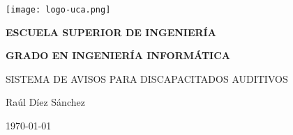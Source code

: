 \begin{titlepage}

  \begin{center}

    \texttt{[image: logo-uca.png]} \\
    
    \vspace{2.5cm}
    
    \LARGE{\textbf{ESCUELA SUPERIOR DE INGENIERÍA}} \\
    
    \vspace{1.0cm}
    
    \Large{\textbf{GRADO EN INGENIERÍA INFORMÁTICA}} \\
    
    \vspace{3.0cm}
    
    \Large{SISTEMA DE AVISOS PARA DISCAPACITADOS AUDITIVOS} \\
    
    \vspace{2.5cm}
    
    \Large{Raúl Díez Sánchez} \\
  
    \vspace{0.5cm}

    \large{\today}
    
  \end{center}
\end{titlepage}
